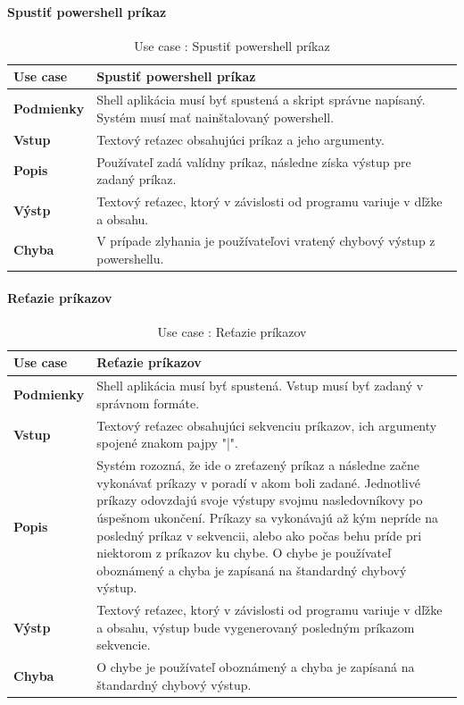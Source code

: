 \paragraph{Spustiť powershell príkaz}
\begin{center}
	\begin{table}[htbp]
		\begin{tabular}{|p{2.5cm}|p{14cm}|}
			\hline
			\textbf{Use case} & Spustiť powershell príkaz \\ 
			\hline
			\textbf{Podmienky} & Shell aplikácia musí byť spustená a skript správne napísaný. Systém musí mať nainštalovaný powershell.\\ 
			\hline
			\textbf{Vstup} & Textový reťazec obsahujúci príkaz a jeho argumenty.\\
			\hline
			\textbf{Popis} & Používateľ zadá valídny príkaz, následne získa výstup pre zadaný príkaz. \\ 
			\hline
			\textbf{Výstp} &Textový reťazec, ktorý v závislosti od programu variuje v dľžke a obsahu. \\
			\hline
			\textbf{Chyba} & V prípade zlyhania je používateľovi vratený chybový výstup z powershellu.\\
			\hline
		\end{tabular}
	\label{table:1}
	\caption{Use case : Spustiť powershell príkaz}
	\end{table}
\end{center}
\newpage
\paragraph{Reťazie príkazov}
\begin{center}
	\begin{table}[htbp]
		\begin{tabular}{|p{2.5cm}|p{14cm}|}
			\hline
			\textbf{Use case} & Reťazie príkazov \\ 
			\hline
			\textbf{Podmienky} & Shell aplikácia musí byť spustená. Vstup musí byť zadaný v správnom formáte.\\ 
			\hline
			\textbf{Vstup} & Textový reťazec obsahujúci sekvenciu príkazov, ich argumenty spojené znakom pajpy "|".\\
			\hline
			\textbf{Popis} & Systém rozozná, že ide o zreťazený príkaz a následne začne vykonávať príkazy v poradí v akom boli zadané. Jednotlivé príkazy odovzdajú svoje výstupy svojmu nasledovníkovy po úspešnom ukončení. Príkazy sa vykonávajú až kým nepríde na posledný príkaz v sekvencii, alebo ako počas behu príde pri niektorom z príkazov ku chybe. O chybe je používateľ oboznámený a chyba je zapísaná na štandardný chybový výstup. \\ 
			\hline
			\textbf{Výstp} & Textový reťazec, ktorý v závislosti od programu variuje v dľžke a obsahu, výstup bude vygenerovaný posledným príkazom sekvencie.\\
			\hline
			\textbf{Chyba} & O chybe je používateľ oboznámený a chyba je zapísaná na štandardný chybový výstup.\\
			\hline
		\end{tabular}
	\label{table:1}
	\caption{Use case : Reťazie príkazov}
	\end{table}
\end{center}


